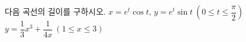 다음 곡선의 길이를 구하시오.
 $x=e^t\cos t$, $y=e^t\sin t\ \left(0\le t\le\dfrac{\pi}{2}\right)$
 $y=\dfrac{1}{3}x^3+\dfrac{1}{4x}\ (1\le x\le 3)$

